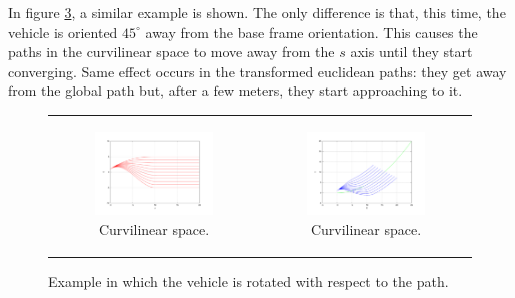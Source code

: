 In figure \ref{fig:cp07_frenet45}, a similar example is shown. The only difference is that, this time, the vehicle is oriented $45^\circ$ away from the base frame orientation. This causes the paths in the curvilinear space to move away from the $s$ axis until they start converging. Same effect occurs in the transformed euclidean paths: they get away from the global path but, after a few meters, they start approaching to it.

\begin{figure}[h!]
\begin{tabular}{cc}
  \begin{subfigure}[b]{0.5\textwidth}
    \centering
    \includegraphics[width=\textwidth, trim=50 40 80 60,clip]{frenet45}
    \caption{Curvilinear space.}
    \label{fig:cp07_frenet45}
  \end{subfigure} &
  \begin{subfigure}[b]{0.5\textwidth}
    \centering
    \includegraphics[width=\textwidth, trim=50 40 80 60,clip]{cartesian45}
    \caption{Curvilinear space.}
    \label{fig:cp07_cartesian45}
    \end{subfigure}
\end{tabular}
\caption{Example in which the vehicle is rotated with respect to the path.}\label{fig:cp07_frenet45}
\end{figure}

